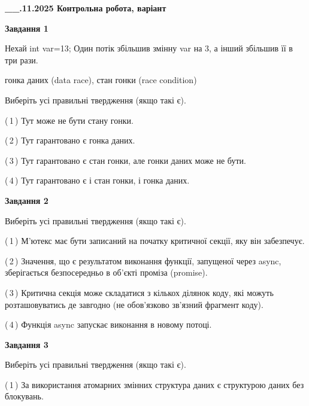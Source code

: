 \documentclass[12pt, ukrainian]{article}
\begin{document}
\begin {large}

\textbf{\_\_.11.2025 Контрольна робота, варіант  }\par


{

\begin{center}
\textbf{Завдання 1}
\end{center}
Нехай int var=13; Один потік збільшив змінну var на 3, а інший збільшив її в три рази.

гонка даних (data race), стан гонки (race condition)

Виберіть усі правильні твердження (якщо такі є).\par
\vspace{2mm}
(\,1\,) Тут може не бути стану гонки.%

(\,2\,) Тут гарантовано є гонка даних.%

(\,3\,) Тут гарантовано є стан гонки, але гонки даних може не бути.%

(\,4\,) Тут гарантовано є і стан гонки, і гонка даних.%



\begin{center}
\textbf{Завдання 2}
\end{center}
Виберіть усі правильні твердження (якщо такі є).\par
\vspace{2mm}

(\,1\,) М’ютекс має бути записаний на початку критичної секції, яку він забезпечує.%

(\,2\,) Значення, що є результатом виконання функції, запущеної через async, зберігається безпосередньо в об’єкті проміза (promise).%

(\,3\,) Критична секція може складатися з кількох ділянок коду, які можуть розташовуватись де завгодно (не обов’язково зв’язний фрагмент коду).%

(\,4\,) Функція async запускає виконання в новому потоці.%



\begin{center}
\textbf{Завдання 3}
\end{center}
Виберіть усі правильні твердження (якщо такі є).\par
\vspace{2mm}

(\,1\,) За використання атомарних змінних структура даних є структурою даних без блокувань.%

}
\end{large}
\end{document}
